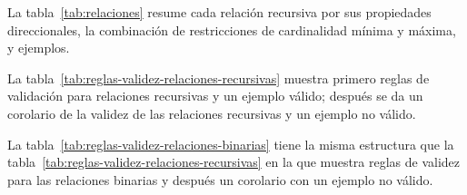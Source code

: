 La tabla~\ref{tab:relaciones} resume cada relación recursiva por sus propiedades direccionales, la combinación de restricciones de cardinalidad mínima y máxima, y ejemplos. 


La tabla~\ref{tab:reglas-validez-relaciones-recursivas} muestra primero reglas de validación para relaciones recursivas y un ejemplo válido; después se da un corolario de la validez de las relaciones recursivas y un ejemplo no válido.


La tabla~\ref{tab:reglas-validez-relaciones-binarias} tiene la misma estructura que la tabla~\ref{tab:reglas-validez-relaciones-recursivas} en la que muestra reglas de validez para las relaciones binarias y después un corolario con un ejemplo no válido.

